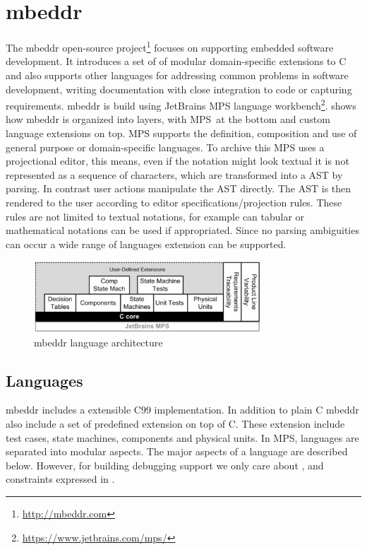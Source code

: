 \section{mbeddr}


The mbeddr open-source project\footnote{ \url{http://mbeddr.com}} 
focuses on supporting embedded software
development. It introduces a set of of modular domain-specific extensions
to C and also supports other languages for addressing common problems 
in software development, \eg writing documentation with close 
integration to code or capturing requirements. mbeddr is build using 
JetBrains \ac{MPS} language 
workbench\footnote{ \url{https://www.jetbrains.com/mps/}}.
 shows how mbeddr is organized into layers, with \ac{MPS} at
the bottom and custom language extensions on top.
\ac{MPS} supports the definition, 
composition and use of general purpose or domain-specific languages. 
To archive this \ac{MPS} uses a projectional editor, this means, even 
if the notation might look textual it is not represented as a sequence 
of characters, which are transformed into a \ac{AST} by parsing. 
In contrast user actions manipulate the \ac{AST} directly. The \ac{AST} 
is then rendered to the user according to editor specifications/projection
rules. These rules are not limited to textual notations, for example can tabular
or mathematical notations can be used if appropriated. Since no parsing ambiguities 
can occur a wide range of languages extension can be supported.

\begin{figure}[h]
  \vspace{-2mm}
  \centering
    \includegraphics[width=8.5cm]{./figures/mbeddArch.png} 
    \vspace{-2mm}
    \caption{mbeddr language architecture~\cite{Voelter:2012:MEC:2384716.2384767}}
  \label{mbeddrArch}
  \vspace{-2mm}
\end{figure}


\subsection{Languages}
\label{languageImplementation}
mbeddr includes a extensible C99 implementation. In addition to plain C 
mbeddr also include a set of predefined extension on top of C. These 
extension include test cases, state machines, components and physical units. 
In \ac{MPS}, languages are separated into modular aspects. 
The major aspects 
of a language are described below. However, for building debugging support
we only care about ,  and constraints expressed in  
.


